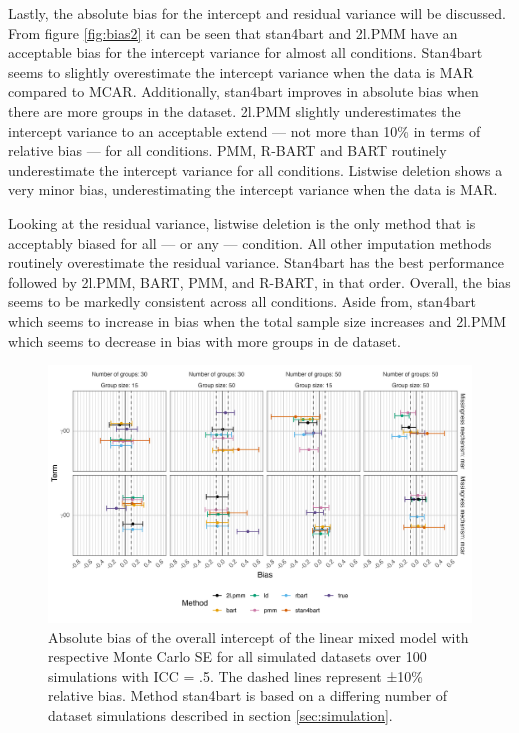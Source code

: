 \documentclass[10pt, a4paper, titlepage]{article}
\begin{document}

Lastly, the absolute bias for the intercept and residual variance will be discussed. From figure \ref{fig:bias2} it can be seen that stan4bart and 2l.PMM have an acceptable bias for the intercept variance for almost all conditions. Stan4bart seems to slightly overestimate the intercept variance when the data is MAR compared to MCAR. Additionally, stan4bart improves in absolute bias when there are more groups in the dataset. 2l.PMM slightly underestimates the intercept variance to an acceptable extend --- not more than 10\% in terms of relative bias --- for all conditions. PMM, R-BART and BART routinely underestimate the intercept variance for all conditions. Listwise deletion shows a very minor bias, underestimating the intercept variance when the data is MAR. 

Looking at the residual variance, listwise deletion is the only method that is acceptably biased for all --- or any --- condition. All other imputation methods routinely overestimate the residual variance. Stan4bart has the best performance followed by 2l.PMM, BART, PMM, and R-BART, in that order. Overall, the bias seems to be markedly consistent across all conditions. Aside from, stan4bart which seems to increase in bias when the total sample size increases and 2l.PMM which seems to decrease in bias with more groups in de dataset. 

\begin{figure}[H]
    \centering
    \includegraphics[width=1\textwidth]{biasintercept.png}
    \caption{Absolute bias of the overall intercept of the linear mixed model with respective Monte Carlo SE for all simulated datasets over 100 simulations with ICC = .5. The dashed lines represent ±10\% relative bias. Method stan4bart is based on a differing number of dataset simulations described in section \ref{sec:simulation}.}
    \label{fig:biasintercept}
\end{figure}
\end{document}
